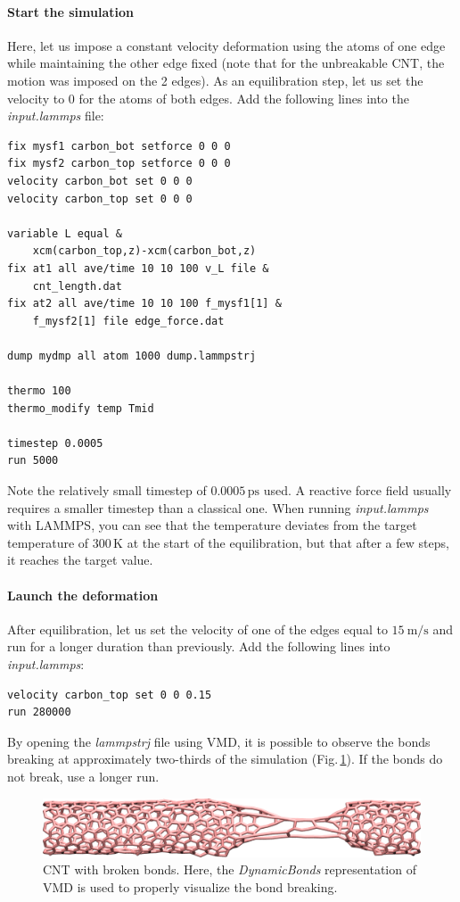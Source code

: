 \documentclass[9pt,tutorial]{livecoms}
\begin{document}
\paragraph{Start the simulation}
Here, let us impose a constant velocity deformation using the atoms of one edge while maintaining the other edge fixed (note that for the unbreakable CNT, the motion was imposed on the 2 edges). As an equilibration step, let us set the velocity to 0 for the atoms of both edges. Add the following lines into the \textit{input.lammps} file:
{\normalsize \begin{verbatim}
fix mysf1 carbon_bot setforce 0 0 0
fix mysf2 carbon_top setforce 0 0 0
velocity carbon_bot set 0 0 0
velocity carbon_top set 0 0 0

variable L equal &
    xcm(carbon_top,z)-xcm(carbon_bot,z)
fix at1 all ave/time 10 10 100 v_L file &
    cnt_length.dat
fix at2 all ave/time 10 10 100 f_mysf1[1] &
    f_mysf2[1] file edge_force.dat

dump mydmp all atom 1000 dump.lammpstrj

thermo 100
thermo_modify temp Tmid

timestep 0.0005
run 5000
\end{verbatim}}
Note the relatively small timestep of $0.0005\,\text{ps}$ used. A reactive force field usually requires a smaller timestep than a classical one. When running \textit{input.lammps} with LAMMPS, you can see that the temperature deviates from the target temperature of $300\,\text{K}$ at the start of the equilibration, but that after a few steps, it reaches the target value.

\paragraph{Launch the deformation}
After equilibration, let us set the velocity of one of the edges equal to $15~\text{m/s}$ and run for a longer duration than previously. Add the following lines into \textit{input.lammps}:
{\normalsize \begin{verbatim}
velocity carbon_top set 0 0 0.15
run 280000
\end{verbatim}}
By opening the \textit{lammpstrj} file using VMD, it is possible to observe the bonds breaking at approximately two-thirds of the simulation (Fig.\,\ref{fig:CNT-deformed-breakable}). If the bonds do not break, use a longer run.

\begin{figure}
\centering
\includegraphics[width=\linewidth]{CNT-deformed-breakable}
\caption{CNT with broken bonds. Here, the \textit{DynamicBonds} representation of VMD is used to properly visualize the bond breaking.}
\label{fig:CNT-deformed-breakable}
\end{figure}
\end{document}
